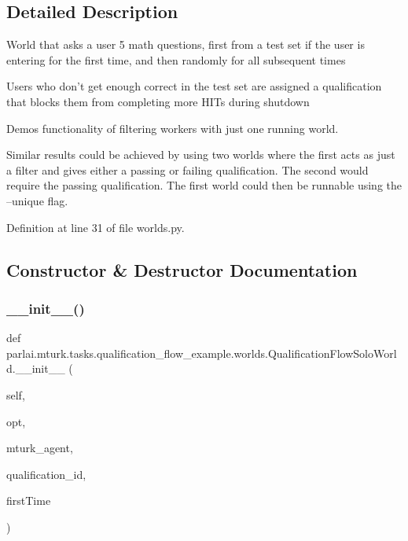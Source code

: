 \subsection{Detailed Description}
\begin{DoxyVerb}World that asks a user 5 math questions, first from a test set if the user
is entering for the first time, and then randomly for all subsequent times

Users who don't get enough correct in the test set are assigned a
qualification that blocks them from completing more HITs during shutdown

Demos functionality of filtering workers with just one running world.

Similar results could be achieved by using two worlds where the first acts
as just a filter and gives either a passing or failing qualification. The
second would require the passing qualification. The first world could then
be runnable using the --unique flag.
\end{DoxyVerb}
 

Definition at line 31 of file worlds.\+py.



\subsection{Constructor \& Destructor Documentation}
\mbox{\label{classparlai_1_1mturk_1_1tasks_1_1qualification__flow__example_1_1worlds_1_1QualificationFlowSoloWorld_a3d703ff5db42f79baaec3cd6e601edaf}} 
\subsubsection{\texorpdfstring{\+\_\+\+\_\+init\+\_\+\+\_\+()}{\_\_init\_\_()}}
{\footnotesize\ttfamily def parlai.\+mturk.\+tasks.\+qualification\+\_\+flow\+\_\+example.\+worlds.\+Qualification\+Flow\+Solo\+World.\+\_\+\+\_\+init\+\_\+\+\_\+ (\begin{DoxyParamCaption}\item[{}]{self,  }\item[{}]{opt,  }\item[{}]{mturk\+\_\+agent,  }\item[{}]{qualification\+\_\+id,  }\item[{}]{first\+Time }\end{DoxyParamCaption})}



